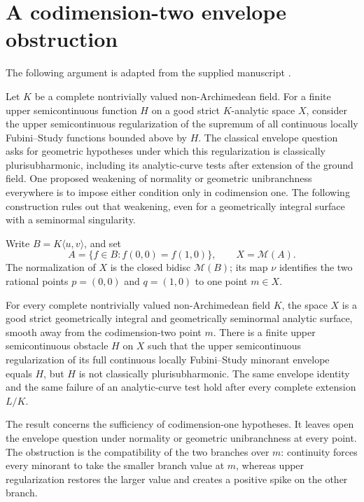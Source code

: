 \section{A codimension-two envelope obstruction}
\label{sec:supplied-p031}

The following argument is adapted from the supplied manuscript
\cite{SuppliedP03120260924}.


Let $K$ be a complete nontrivially valued non-Archimedean field. For a finite upper semicontinuous function $H$ on a good strict $K$-analytic space $X$, consider the upper semicontinuous regularization of the supremum of all continuous locally Fubini--Study functions bounded above by $H$. The classical envelope question asks for geometric hypotheses under which this regularization is classically plurisubharmonic, including its analytic-curve tests after extension of the ground field. One proposed weakening of normality or geometric unibranchness everywhere is to impose either condition only in codimension one. The following construction rules out that weakening, even for a geometrically integral surface with a seminormal singularity.

Write $B=K\langle u,v\rangle$, and set
\[
 A=\{f\in B:f(0,0)=f(1,0)\},\qquad X=\mathcal M(A).
\]
The normalization of $X$ is the closed bidisc $\mathcal M(B)$; its map $\nu$ identifies the two rational points $p=(0,0)$ and $q=(1,0)$ to one point $m\in X$.

\begin{theorem}\label{thm:supplied-p031-codimension-two-envelope}
For every complete nontrivially valued non-Archimedean field $K$, the space $X$ is a good strict geometrically integral and geometrically seminormal analytic surface, smooth away from the codimension-two point $m$. There is a finite upper semicontinuous obstacle $H$ on $X$ such that the upper semicontinuous regularization of its full continuous locally Fubini--Study minorant envelope equals $H$, but $H$ is not classically plurisubharmonic. The same envelope identity and the same failure of an analytic-curve test hold after every complete extension $L/K$.
\end{theorem}

The result concerns the sufficiency of codimension-one hypotheses. It leaves open the envelope question under normality or geometric unibranchness at every point. The obstruction is the compatibility of the two branches over $m$: continuity forces every minorant to take the smaller branch value at $m$, whereas upper regularization restores the larger value and creates a positive spike on the other branch.

